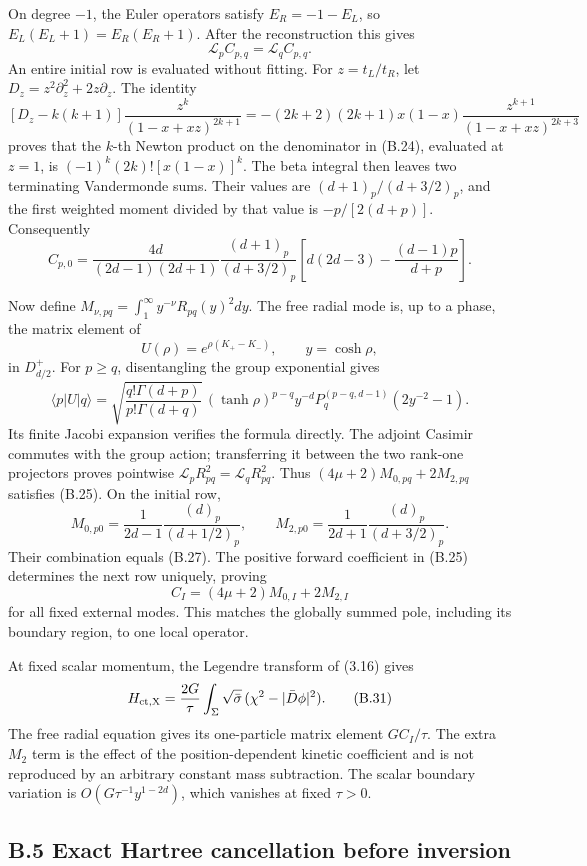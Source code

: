 On degree \(-1\), the Euler operators satisfy \(E_R=-1-E_L\), so \(E_L(E_L+1)=E_R(E_R+1)\). After the reconstruction this gives \[
\mathscr L_pC_{p,q}=\mathscr L_qC_{p,q}.
\tag{B.25}
\] An entire initial row is evaluated without fitting. For \(z=t_L/t_R\), let \(D_z=z^2\partial_z^2+2z\partial_z\). The identity \[
[D_z-k(k+1)]
\frac{z^k}{(1-x+xz)^{2k+1}}
=-(2k+2)(2k+1)x(1-x)
\frac{z^{k+1}}{(1-x+xz)^{2k+3}}
\tag{B.26}
\] proves that the \(k\)-th Newton product on the denominator in (B.24), evaluated at \(z=1\), is \((-1)^k(2k)![x(1-x)]^k\). The beta integral then leaves two terminating Vandermonde sums. Their values are \((d+1)_p/(d+3/2)_p\), and the first weighted moment divided by that value is \(-p/[2(d+p)]\). Consequently \[
C_{p,0}=
\frac{4d}{(2d-1)(2d+1)}
\frac{(d+1)_p}{(d+3/2)_p}
\left[d(2d-3)-\frac{(d-1)p}{d+p}\right].
\tag{B.27}
\]

Now define \(M_{\nu,pq}=\int_1^\infty y^{-\nu}R_{pq}(y)^2dy\). The free radial mode is, up to a phase, the matrix element of \[
U(\rho)=e^{\rho(K_+-K_-)},\qquad y=\cosh\rho ,
\] in \(D^+_{d/2}\). For \(p\ge q\), disentangling the group exponential gives \[
\langle p|U|q\rangle
=\sqrt{\frac{q!\Gamma(d+p)}{p!\Gamma(d+q)}}\,
(\tanh\rho)^{p-q}y^{-d}
P_q^{(p-q,d-1)}(2y^{-2}-1).
\tag{B.28}
\] Its finite Jacobi expansion verifies the formula directly. The adjoint Casimir commutes with the group action; transferring it between the two rank-one projectors proves pointwise \(\mathscr L_pR_{pq}^2=\mathscr L_qR_{pq}^2\). Thus \((4\mu+2)M_{0,pq}+2M_{2,pq}\) satisfies (B.25). On the initial row, \[
M_{0,p0}=\frac1{2d-1}\frac{(d)_p}{(d+1/2)_p},
\qquad
M_{2,p0}=\frac1{2d+1}\frac{(d)_p}{(d+3/2)_p}.
\tag{B.29}
\] Their combination equals (B.27). The positive forward coefficient in (B.25) determines the next row uniquely, proving \[
C_I=(4\mu+2)M_{0,I}+2M_{2,I}
\tag{B.30}
\] for all fixed external modes. This matches the globally summed pole, including its boundary region, to one local operator.

At fixed scalar momentum, the Legendre transform of (3.16) gives \[
H_{\rm ct,X}=\frac{2G}{\tau}
\int_\Sigma\sqrt{\bar\sigma}\,
(\chi^2-|\bar D\phi|^2).
\tag{B.31}
\] The free radial equation gives its one-particle matrix element \(GC_I/\tau\). The extra \(M_2\) term is the effect of the position-dependent kinetic coefficient and is not reproduced by an arbitrary constant mass subtraction. The scalar boundary variation is \(O(G\tau^{-1}y^{1-2d})\), which vanishes at fixed \(\tau>0\).

\hypertarget{b.5-exact-hartree-cancellation-before-inversion}{%
\subsection{B.5 Exact Hartree cancellation before inversion}\label{b.5-exact-hartree-cancellation-before-inversion}}

